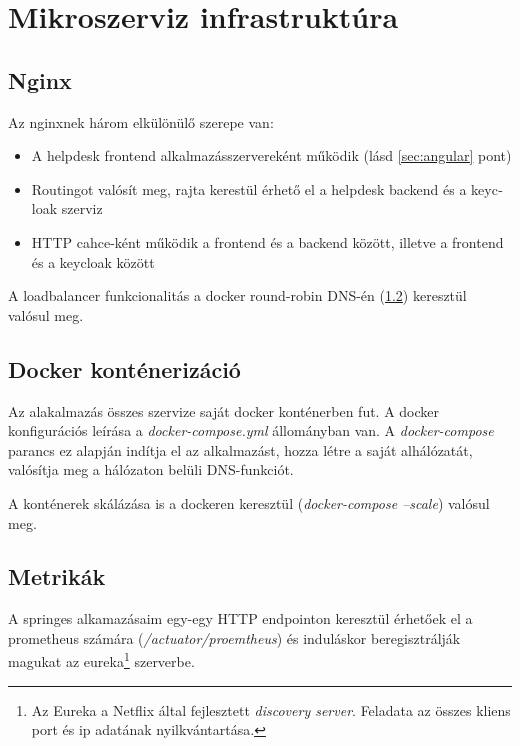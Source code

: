 \section{Mikroszerviz infrastruktúra}

\subsection{Nginx}
Az nginxnek három elkülönülő szerepe van:

\begin{itemize}
	\item{A \foreignlanguage{british}{helpdesk frontend} alkalmazásszervereként működik (lásd \ref{sec:angular} pont)}
	
	\item{\foreignlanguage{british}{Routing}ot valósít meg, rajta kerestül érhető el a \foreignlanguage{british}{helpdesk backend} és a \foreignlanguage{british}{keycloak} szerviz}
	
	\item{\foreignlanguage{british}{HTTP cahce}-ként működik a frontend és a backend között, illetve a frontend és a keycloak között}
\end{itemize}

A loadbalancer funkcionalitás a \foreignlanguage{british}{docker round-robin DNS}-én (\ref{sec:docker}) keresztül valósul meg.


\subsection{Docker konténerizáció}\label{sec:docker}
Az alakalmazás összes szervize saját docker konténerben fut. A docker konfigurációs leírása a \textit{docker-compose.yml} állományban van. A \textit{docker-compose} parancs ez alapján indítja el az alkalmazást, hozza létre a saját alhálózatát, valósítja meg a hálózaton belüli DNS-funkciót.

A konténerek skálázása  is a dockeren keresztül (\textit{docker-compose --scale}) valósul meg.



\subsection{Metrikák}
A springes alkamazásaim egy-egy HTTP endpointon keresztül érhetőek el a prometheus számára (\textit{\mbox{/actuator/proemtheus}}) és induláskor beregisztrálják magukat az eureka\footnote{Az Eureka a Netflix által fejlesztett \textit{discovery server}. Feladata az összes kliens port és ip adatának nyilkvántartása.} szerverbe.

